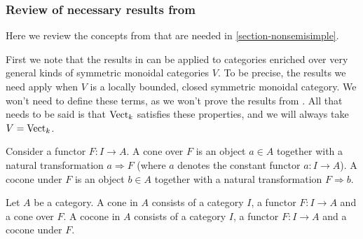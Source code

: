 % 
% 
% 


\subsubsection{Review of necessary results from \cite{kelly/basic-concepts-enriched}}\label{review_kelly}

Here we review the concepts from \cite{kelly/basic-concepts-enriched} that are needed in \ref{section-nonsemisimple}.

First we note that the results in \cite{kelly/basic-concepts-enriched} can be applied to categories enriched over very general kinds of symmetric monoidal categories $V$. To be precise, the results we need apply when $V$ is a locally bounded, closed symmetric monoidal category. We won't need to define these terms, as we won't prove the results from \cite{kelly/basic-concepts-enriched}. All that needs to be said is that $\operatorname{Vect}_k$ satisfies these properties, and we will always take $V=\operatorname{Vect}_k$.

\begin{definition}

Consider a functor $F:I\to A$. A cone over $F$ is an object $a\in A$ together with a natural transformation $a\Rightarrow F$ (where $a$ denotes the constant functor $a:I\to A$). A cocone under $F$ is an object $b\in A$ together with a natural transformation $F\Rightarrow b$.\end{definition}

\begin{definition}

Let $A$ be a category. A cone in $A$ consists of a category $I$, a functor $F:I\to A$ and a cone over $F$. A cocone in $A$ consists of a category $I$, a functor $F:I\to A$ and a cocone under $F$.\end{definition}

